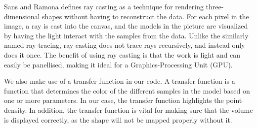 \documentclass[a4paper,12pt]{extarticle}
\begin{document}
Sans and Ramona \cite{san_2017} defines ray casting as a technique for rendering three-dimensional shapes without having to reconstruct the data. For each pixel in the image, a ray is cast into the canvas, and the models in the picture are visualized by having the light interact with the samples from the data. Unlike the similarly named ray-tracing, ray casting does not trace rays recursively, and instead only does it once. The benefit of using ray casting is that the work is light and can easily be panellised, making it ideal for a Graphics-Processing Unit (GPU).

We also make use of a transfer function in our code. A transfer function is a function that determines the color of the different samples in the model based on one or more parameters. In our case, the transfer function highlights the point density. In addition, the transfer function is vital for making sure that the volume is displayed correctly, as the shape will not be mapped properly without it.



\end{document}
